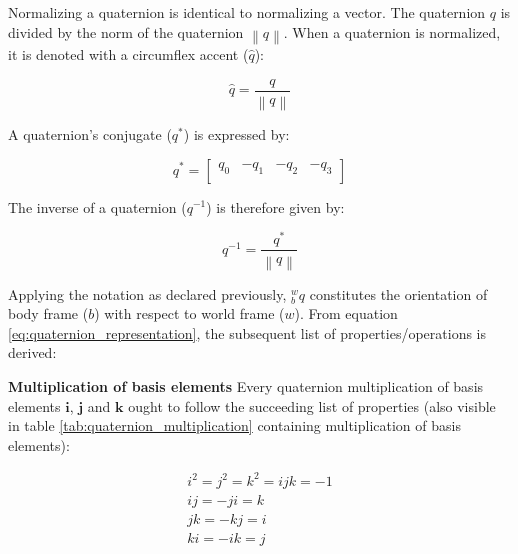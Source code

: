 Normalizing a quaternion is identical to normalizing a vector. The quaternion $q$ is divided by the norm of the quaternion $\left\lVert q \right\rVert$. When a quaternion is normalized, it is denoted with a circumflex accent ($\hat{q}$):

\begin{equation}
    \hat{q} = \frac{q}{\left\lVert q \right\rVert }
\end{equation}


A quaternion's conjugate ($q^{\ast} $) is expressed by:

\begin{equation}
    q^{\ast}  =\begin{bmatrix}
        q_0 & -q_1 & -q_2 & -q_3 \\
    \end{bmatrix}
\end{equation}

The inverse of a quaternion (${q^{-1}}$) is therefore given by:

\begin{equation}
    q^{-1} = \frac{q^{\ast} }{\left\lVert q \right\rVert }
\end{equation}

Applying the notation as declared previously, ${^w_b}q$ constitutes the orientation of body frame ($b$) with respect to world frame ($w$). From equation \ref{eq:quaternion_representation}, the subsequent list of properties/operations is derived:

\item \textbf{Multiplication of basis elements} Every quaternion multiplication of basis elements $\boldsymbol{i}$, $\boldsymbol{j}$ and $\boldsymbol{k}$ ought to follow the succeeding list of properties (also visible in table \ref{tab:quaternion_multiplication} containing multiplication of basis elements):


\begin{equation}
    \begin{gathered}
        i^2=j^2=k^2=ijk=-1 \\
        ij = -ji = k       \\
        jk = -kj = i       \\
        ki = -ik = j       \\
    \end{gathered}
    \label{eq:quaternion_rules}
\end{equation}

